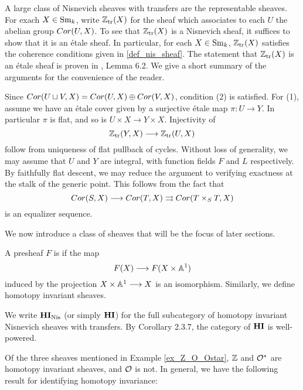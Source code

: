 \begin{ex}
A large class of Nisnevich sheaves with transfers are the 
representable sheaves. For exach $X \in \mathrm{Sm}_{k}$, write $\mathbb{Z}_{\mathrm{tr}}(X)$
for the sheaf which associates to each $U$ the abelian group
$Cor(U, X)$. To see that $\mathbb{Z}_{\mathrm{tr}}(X)$ is a Nisnevich sheaf, it
suffices to show that it is an \'etale sheaf. In particular,
for each $X \in \mathrm{Sm}_{k}$, $\mathbb{Z}_{\mathrm{tr}}(X)$ satisfies the coherence 
conditions given in \ref{def_nis_sheaf}. The statement that
$\mathbb{Z}_{\mathrm{tr}}(X)$ is an \'etale sheaf is proven in \cite{MVW}, Lemma 6.2.
We give a short summary of the arguments for the convenience of
the reader.

Since $Cor(U \sqcup V, X) = Cor(U, X) \oplus Cor(V, X)$, condition 
(2) is satisfied. For (1), assume we have an \'etale cover given
by a surjective \'etale map $\pi: U \to Y$. In particular $\pi$ is
flat, and so is $U \times X \to Y \times X$. Injectivity of
\[
\mathbb{Z}_{\mathrm{tr}}(Y, X) \longrightarrow \mathbb{Z}_{\mathrm{tr}}(U, X)
\]
follow from uniqueness of flat pullback of cycles. Without loss
of generality, we may assume that $U$ and $Y$ are integral, with
function fields $F$ and $L$ respectively. By faithfully flat 
descent, we may reduce the argument to verifying exactness at
the stalk of the generic point. This follows from the fact that
\[
Cor(S, X) \longrightarrow Cor(T, X) \rightrightarrows Cor(T \times_S T, X)
\]
is an equalizer sequence.
\end{ex}

We now introduce a class of sheaves that will be the focus of
later sections.

\begin{defn}
A presheaf $F$ is  if the map 
\[
F(X) \longrightarrow F(X \times \mathbb{A}^1)
\]
induced by the projection $X \times \mathbb{A}^1 \longrightarrow X$ is an isomorphism.
Similarly, we define homotopy invariant sheaves.
\end{defn}

We write $\mathbf{HI}_{\mathrm{Nis}}$ (or simply $\mathbf{HI}$) for the full subcategory 
of homotopy invariant Nisnevich sheaves with transfers. By
\cite{Bo} Corollary 2.3.7, the category of $\mathbf{HI}$ is well-powered.

Of the three sheaves mentioned in Example \ref{ex_Z_O_Ostar}, $\mathbb{Z}$
and $\mathcal{O}^*$ are homotopy invariant sheaves, and $\mathcal{O}$ is not. In 
general, we have the following result for identifying homotopy 
invariance:

